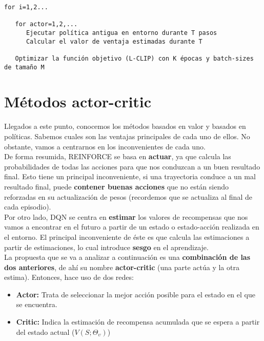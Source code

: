 \documentclass[11pt,fleqn]{book} %
\begin{document}

\begin{verbatim}
for i=1,2... 

   for actor=1,2,...
      Ejecutar política antigua en entorno durante T pasos
      Calcular el valor de ventaja estimadas durante T
   
   Optimizar la función objetivo (L-CLIP) con K épocas y batch-sizes de tamaño M
\end{verbatim}

\section{Métodos actor-critic}\label{sec:actorcritic}

Llegados a este punto, conocemos los métodos basados en valor y basados en políticas. Sabemos cuales son las ventajas principales de cada uno de ellos. No obstante, vamos a centrarnos en los inconvenientes de cada uno. \\

De forma resumida, REINFORCE se basa en \textbf{actuar}, ya que calcula las probabilidades de todas las acciones para que nos conduzcan a un buen resultado final. Esto tiene un principal inconveniente, si una trayectoria conduce a un mal resultado final, puede \textbf{contener buenas acciones} que no están siendo reforzadas en su actualización de pesos (recordemos que se actualiza al final de cada episodio). \\

Por otro lado, DQN se centra en \textbf{estimar} los valores de recompensas que nos vamos a encontrar en el futuro a partir de un estado o estado-acción realizada en el entorno. El principal inconveniente de éste es que calcula las estimaciones a partir de estimaciones, lo cual introduce \textbf{sesgo} en el aprendizaje. \\

La propuesta que se va a analizar a continuación es una \textbf{combinación de las dos anteriores}, de ahí su nombre \textbf{actor-critic} (una parte actúa y la otra estima). Entonces, hace uso de dos redes: \\

\begin{itemize}
	\item \textbf{Actor:} Trata de seleccionar la mejor acción posible para el estado en el que se encuentra.\\
	
	\item \textbf{Critic:} Indica la estimación de recompensa acumulada que se espera a partir del estado actual ($V(S;\Theta_\upsilon)$) \\
\end{itemize}
\end{document}
